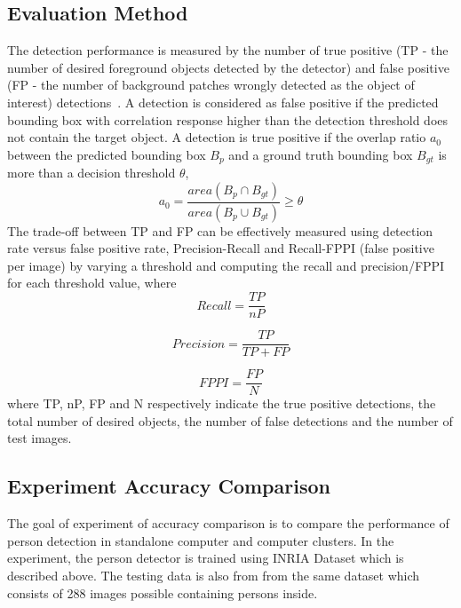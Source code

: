\subsection{Evaluation Method}
\label{subsec:evaluation_method}
The detection performance is measured by the number of true positive (TP - the
number of desired foreground objects detected by the detector) and false
positive  (FP - the number of background patches wrongly detected as the object
of  interest) detections~\cite{2013_ICCV_Hamed}. A detection is considered as
false positive if the predicted  bounding box with correlation response higher than the detection
threshold does not contain the target object. A detection is true positive if 
the overlap ratio $a_0$ between the predicted bounding box $B_p$ and a ground
truth bounding box $B_{gt}$ is more than a decision threshold $\theta$,
\begin{equation}
	a_0 = \frac{area(B_p \cap B_{gt})}{area(B_p \cup B_{gt})} \geq \theta
\end{equation}
The trade-off between TP and FP can be effectively measured using detection
rate versus false positive rate, Precision-Recall and Recall-FPPI  (false
positive per image) by varying a threshold and computing the recall and
precision/FPPI  for each threshold value, where
\begin{equation}
	Recall = \frac{TP}{nP}
\end{equation}

\begin{equation}
	Precision = \frac{TP}{TP + FP}
\end{equation}

\begin{equation}
	FPPI = \frac{FP}{N}
\end{equation}
where TP, nP, FP and N respectively indicate the true positive detections, the
total number of desired objects, the number of false detections and the number of test images.


\subsection{Experiment Accuracy Comparison}
The goal of experiment of accuracy comparison is to compare the performance of
person detection in standalone computer and computer clusters. In the
experiment, the person detector is trained using INRIA Dataset which is
described above. The testing data is also from from the same dataset which
consists of 288 images possible containing persons inside. 

